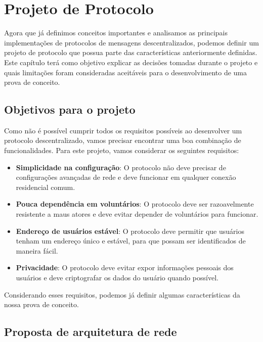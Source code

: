 
\chapter{Projeto de Protocolo}

Agora que já definimos conceitos importantes e analisamos as principais implementações de protocolos de mensagens descentralizados, podemos definir um projeto de protocolo que possua parte das características anteriormente definidas. Este capítulo terá como objetivo explicar as decisões tomadas durante o projeto e quais limitações foram consideradas aceitáveis para o desenvolvimento de uma prova de conceito.

\section{Objetivos para o projeto}

Como não é possível cumprir todos os requisitos possíveis ao desenvolver um protocolo descentralizado, vamos precisar encontrar uma boa combinação de funcionalidades. Para este projeto, vamos considerar os seguintes requisitos:

\begin{itemize}
    \item \textbf{Simplicidade na configuração}: O protocolo não deve precisar de configurações avançadas de rede e deve funcionar em qualquer conexão residencial comum.
    \item \textbf{Pouca dependência em voluntários}: O protocolo deve ser razoavelmente resistente a maus atores e deve evitar depender de voluntários para funcionar.
    \item \textbf{Endereço de usuários estável}: O protocolo deve permitir que usuários tenham um endereço único e estável, para que possam ser identificados de maneira fácil.
    \item \textbf{Privacidade}: O protocolo deve evitar expor informações pessoais dos usuários e deve criptografar os dados do usuário quando possível.
\end{itemize}

Considerando esses requisitos, podemos já definir algumas características da nossa prova de conceito. 

\section{Proposta de arquitetura de rede}

